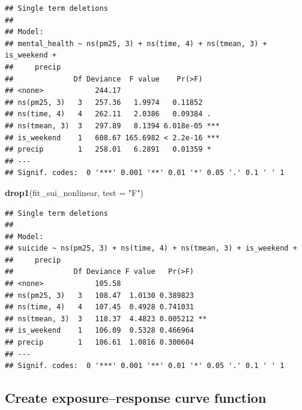 \documentclass[
]{article}
\newenvironment{Shaded}{\begin{snugshade}}{\end{snugshade}}
\newcommand{\AttributeTok}[1]{\textcolor[rgb]{0.13,0.29,0.53}{#1}}
\newcommand{\FunctionTok}[1]{\textcolor[rgb]{0.13,0.29,0.53}{\textbf{#1}}}
\newcommand{\NormalTok}[1]{#1}
\newcommand{\StringTok}[1]{\textcolor[rgb]{0.31,0.60,0.02}{#1}}
\begin{document}
\begin{verbatim}
## Single term deletions
## 
## Model:
## mental_health ~ ns(pm25, 3) + ns(time, 4) + ns(tmean, 3) + is_weekend + 
##     precip
##              Df Deviance  F value    Pr(>F)    
## <none>            244.17                       
## ns(pm25, 3)   3   257.36   1.9974   0.11852    
## ns(time, 4)   4   262.11   2.0386   0.09384 .  
## ns(tmean, 3)  3   297.89   8.1394 6.018e-05 ***
## is_weekend    1   608.67 165.6982 < 2.2e-16 ***
## precip        1   258.01   6.2891   0.01359 *  
## ---
## Signif. codes:  0 '***' 0.001 '**' 0.01 '*' 0.05 '.' 0.1 ' ' 1
\end{verbatim}

\begin{Shaded}
\begin{Highlighting}[]
\FunctionTok{drop1}\NormalTok{(fit\_sui\_nonlinear, }\AttributeTok{test =} \StringTok{"F"}\NormalTok{)}
\end{Highlighting}
\end{Shaded}

\begin{verbatim}
## Single term deletions
## 
## Model:
## suicide ~ ns(pm25, 3) + ns(time, 4) + ns(tmean, 3) + is_weekend + 
##     precip
##              Df Deviance F value   Pr(>F)   
## <none>            105.58                    
## ns(pm25, 3)   3   108.47  1.0130 0.389823   
## ns(time, 4)   4   107.45  0.4928 0.741031   
## ns(tmean, 3)  3   118.37  4.4823 0.005212 **
## is_weekend    1   106.09  0.5328 0.466964   
## precip        1   106.61  1.0816 0.300604   
## ---
## Signif. codes:  0 '***' 0.001 '**' 0.01 '*' 0.05 '.' 0.1 ' ' 1
\end{verbatim}

\subsection{Create exposure--response curve
function}\label{create-exposureresponse-curve-function}
\end{document}
